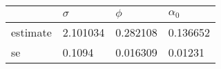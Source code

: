 \begin{tabular}{llll}
\toprule
{} &  $\sigma$ &    $\phi$ & $\alpha_0$ \\
\midrule
estimate &  2.101034 &  0.282108 &   0.136652 \\
se       &    0.1094 &  0.016309 &    0.01231 \\
\bottomrule
\end{tabular}
